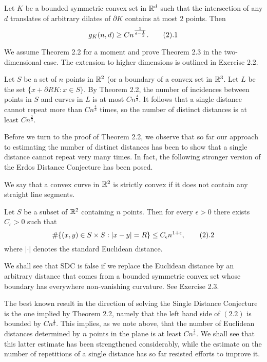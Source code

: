  Let $K$ be a bounded symmetric convex set
in ${\Bbb R}^d$ such that the intersection of any $d$ translates
of arbitrary dilates of $\partial K$ contains at most $2$ points.
Then
$$ g_K(n,d) \ge Cn^{\frac{1}{d-\frac{1}{2}}}. \tag2.1$$ \endproclaim

We assume Theorem 2.2 for a moment and prove Theorem 2.3 in the
two-dimensional case. The extension to higher dimensions is
outlined in Exercise 2.2.

Let $S$ be a set of $n$ points in ${\Bbb R}^2$ (or a boundary of a
convex set in ${\Bbb R}^3$. Let $L$ be the set $\{x+\partial RK: x
\in S\}$. By Theorem 2.2, the number of incidences between points
in $S$ and curves in $L$ is at most $Cn^{\frac{4}{3}}$. It follows
that a single distance cannot repeat more than $Cn^{\frac{4}{3}}$
times, so the number of distinct distances is at least
$Cn^{\frac{2}{3}}$.

Before we turn to the proof of Theorem 2.2, we observe that so far
our approach to estimating the number of distinct distances has
been to show that a single distance cannot repeat very many times.
In fact, the following stronger version of the Erdos Distance
Conjecture has been posed.

 We say that a convex curve in ${\Bbb R}^2$ is
strictly convex if it does not contain any straight line segments.
\enddefinition

 Let $S$ be a subset of
${\Bbb R}^2$ containing $n$ points. Then for every $\epsilon>0$
there exists $C_{\epsilon}>0$ such that
$$ \# \{(x,y) \in S \times S: |x-y|=R\}
\leq C_{\epsilon}n^{1+\epsilon}, \tag2.2$$ where $|\cdot|$ denotes
the standard Euclidean distance.
\endproclaim

We shall see that SDC is false if we replace the Euclidean
distance by an arbitrary distance that comes from a bounded
symmetric convex set whose boundary has everywhere non-vanishing
curvature. See Exercise 2.3.

The best known result in the direction of solving the Single
Distance Conjecture is the one implied by Theorem 2.2, namely that
the left hand side of $(2.2)$ is bounded by $Cn^{\frac{4}{3}}$.
This implies, as we note above, that the number of Euclidean
distances determined by $n$ points in the plane is at least
$Cn^{\frac{2}{3}}$. We shall see that this latter estimate has
been strengthened considerably, while the estimate on the number
of repetitions of a single distance has so far resisted efforts to
improve it.

